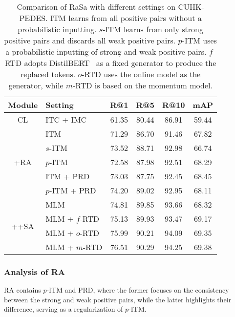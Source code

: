 \documentclass{article}
\begin{document}
\begin{table}[tp]
\small
\renewcommand\arraystretch{1.2}
\setlength{\tabcolsep}{5pt}
\centering
\begin{tabular}{c|l|cccc} 
\hline
Module              & Setting         & R@1            & R@5            & R@10           & mAP             \\ 
\hline
CL                  & ITC + IMC         & 61.35          & 80.44          & 86.91          & 59.44           \\ 
\hline
\multirow{5}{*}{+RA} & ITM            & 71.29          & 86.70          & 91.46          & 67.82           \\
                    & $s$-ITM          & 73.52          & 88.71          & 92.98          & 66.74           \\
                    & $p$-ITM          & 72.58          & 87.98          & 92.51          & 68.29           \\
                    & ITM + PRD        & 73.03          & 87.75          & 92.45          & 68.45           \\
                    & $p$-ITM + PRD      & 74.20          & 89.02          & 92.95          & 68.11           \\ 
\hline
\multirow{4}{*}{++SA} & MLM         & 74.81          & 89.85          & 93.66          & 68.32           \\
                    & MLM + $f$-RTD & 75.13          & 89.93          & 93.47          & 69.17           \\
                    & MLM + $o$-RTD & 75.99          & 90.21          & 94.09          & 69.35           \\
                    & MLM + $m$-RTD & 76.51          & 90.29          & 94.25          & 69.38  \\
\hline
\end{tabular}
\caption{Comparison of RaSa with different settings on CUHK-PEDES. ITM learns from all positive pairs without a probabilistic inputting. $s$-ITM learns from only strong positive pairs and discards all weak positive pairs. $p$-ITM uses a probabilistic inputting of strong and weak positive pairs. $f$-RTD adopts DistilBERT~\protect\cite{sanh2019distilbert} as a fixed generator to produce the replaced tokens. $o$-RTD uses the online model as the generator, while $m$-RTD is based on the momentum model.}
\label{table4}
\end{table}



\subsubsection{Analysis of RA}
RA contains $p$-ITM and PRD, where the former focuses on the consistency between the strong and weak positive pairs, while the latter highlights their difference, serving as a regularization of $p$-ITM. 
\end{document}
